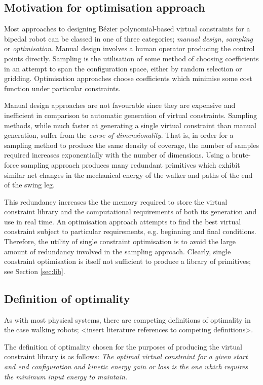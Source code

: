 \subsection{Motivation for optimisation approach}
Most approaches to designing Bézier polynomial-based virtual constraints for a bipedal robot can be classed in one of three categories; \textit{manual design}, \textit{sampling} or \textit{optimisation}. Manual design involves a human operator producing the control points directly. Sampling is the utilisation of some method of choosing coefficients in an attempt to span the configuration space, either by random selection or gridding. Optimisation approaches choose coefficients which minimise some cost function under particular constraints.

Manual design approaches are not favourable since they are expensive and inefficient in comparison to automatic generation of virtual constraints. Sampling methods, while much faster at generating a single virtual constraint than manual generation, suffer from the \textit{curse of dimensionality}. That is, in order for a sampling method to produce the same density of coverage, the number of samples required increases exponentially with the number of dimensions. Using a brute-force sampling approach produces many redundant primitives which exhibit similar net changes in the mechanical energy of the walker and paths of the end of the swing leg.

This redundancy increases the the memory required to store the virtual constraint library and the computational requirements of both its generation and use in real time. An optimisation approach attempts to find the best virtual constraint subject to particular requirements, e.g. beginning and final conditions. Therefore, the utility of single constraint optimisation is to avoid the large amount of redundancy involved in the sampling approach. Clearly, single constraint optimisation is itself not sufficient to produce a library of primitives; see Section \ref{sec:lib}.

\subsection{Definition of optimality}
As with most physical systems, there are competing definitions of optimality in the case walking robots; {\color{red}<insert literature references to competing definitions>}.

The definition of optimality chosen for the purposes of producing the virtual constraint library is as follows:
\emph{The optimal virtual constraint for a given start and end configuration and kinetic energy gain or loss is the one which requires the minimum input energy to maintain.}


